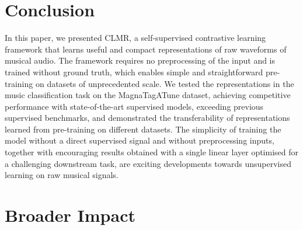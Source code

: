 
\section{Conclusion}\label{sec:conclusion}
In this paper, we presented CLMR, a self-supervised contrastive learning framework that learns useful and compact representations of raw waveforms of musical audio. The framework requires no preprocessing of the input and is trained without ground truth, which enables simple and straightforward pre-training on datasets of unprecedented scale. We tested the representations in the music classification task on the MagnaTagATune dataset, achieving competitive performance with state-of-the-art supervised models, exceeding previous supervised benchmarks, and demonstrated the transferability of representations learned from pre-training on different datasets. The simplicity of training the model without a direct supervised signal and without preprocessing inputs, together with encouraging results obtained with a single linear layer optimised for a challenging downstream task, are exciting developments towards unsupervised learning on raw musical signals.

\section{Broader Impact}
